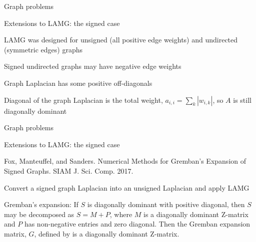 \documentclass[18pt,xcolor=table]{beamer}
\begin{document}
\begin{frame}{Graph problems}
\begin{block}{Extensions to LAMG: the signed case}
\bit
\item LAMG was designed for unsigned (all positive edge weights) and undirected (symmetric edges) graphs
\item Signed undirected graphs may have negative edge weights
\item Graph Laplacian has some positive off-diagonals 
\item Diagonal of the graph Laplacian is the total weight, $a_{i,i} = \sum_k |w_{i,k}|$, so $A$ is still diagonally dominant
\eit
\end{block}
\end{frame}

\begin{frame}{Graph problems}
\begin{block}{Extensions to LAMG: the signed case}
\bit
\item Fox, Manteuffel, and Sanders. Numerical Methods for Gremban's Expansion of Signed Graphs. SIAM J. Sci. Comp. 2017.
\item Convert a signed graph Laplacian into an unsigned Laplacian and apply LAMG
\item Gremban's expansion: If $S$ is diagonally dominant with positive diagonal, then $S$ may be decomposed as $S = M + P$, where $M$ is a diagonally dominant Z-matrix and $P$ has non-negative entries and zero diagonal. Then the Gremban expansion matrix, $G$, defined by
is a diagonally dominant Z-matrix.
\eit
\end{block}
\end{frame}
\end{document}
